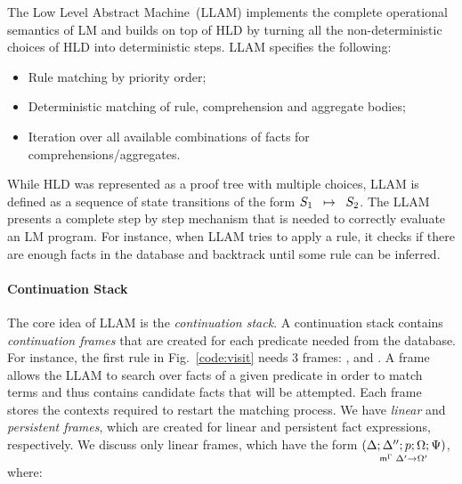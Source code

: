 The Low Level Abstract Machine~(LLAM) implements the complete operational
semantics of LM and builds on top of HLD by turning all the non-deterministic
choices of HLD into deterministic steps. LLAM specifies the following:

\begin{itemize}

   \item Rule matching by priority order;

   \item Deterministic matching of rule, comprehension and
      aggregate bodies;

   \item Iteration over all available combinations of facts for comprehensions/aggregates.

\end{itemize}

While HLD was represented as a proof tree with multiple choices, LLAM is defined
as a sequence of state transitions of the form $\trans{S_1}{S_2}$.  The LLAM
presents a complete step by step mechanism that is needed to correctly evaluate
an LM program. For instance, when LLAM tries to apply a rule, it checks if there
are enough facts in the database and backtrack until some rule can be inferred.

\paragraph{Continuation Stack} The core idea of LLAM is the \emph{continuation
stack}. A continuation stack contains \emph{continuation frames} that are
created for each predicate needed from the database. For instance, the first
rule in Fig.~\ref{code:visit} needs 3 frames: ,  and
. A frame allows the LLAM to search over facts of a given predicate
in order to match terms and thus contains candidate facts that will be
attempted. Each frame stores the contexts required to restart the matching
process. We have \emph{linear} and \emph{persistent frames}, which are created
for linear and persistent fact expressions, respectively.  We discuss only
linear frames, which have the form $\lframe{\Delta}{\Delta''}{p}{\Omega;
\Psi}{\Delta'}{\Omega'}$, where:

